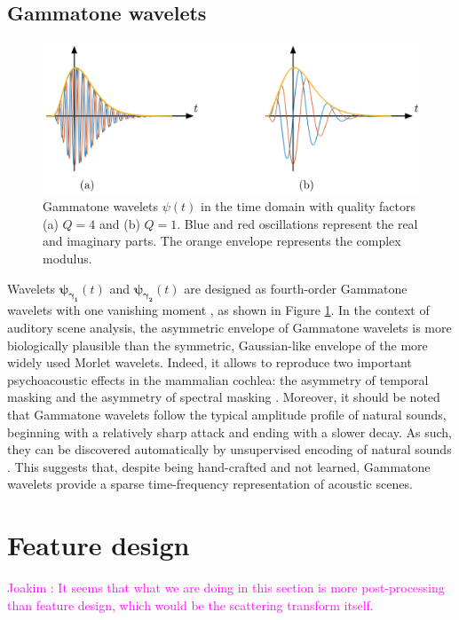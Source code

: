 \documentclass[journal]{IEEEtran}
\newcommand{\ja}[1]{\textcolor{magenta}{Joakim : #1}}
\begin{document}
\subsection{Gammatone wavelets}
\begin{figure}
\begin{center}
\includegraphics[width=\columnwidth]{gammatones.png}
\caption{
\label{fig:gammatones}
Gammatone wavelets $\psi(t)$ in the time domain with quality factors (a) $Q = 4$ and (b) $Q = 1$. Blue and red oscillations represent the real and imaginary parts. The orange envelope represents the complex modulus.}
\end{center}
\end{figure}
Wavelets
$\boldsymbol{\psi_{\gamma_1}}(t)$ and $\boldsymbol{\psi_{\gamma_2}}(t)$ are designed as fourth-order Gammatone
wavelets with one vanishing moment \cite{Venkitaraman2014}, as shown in Figure \ref{fig:gammatones}.
In the context of auditory scene analysis, the asymmetric envelope of Gammatone wavelets is more biologically plausible than the symmetric, Gaussian-like envelope of the more widely used Morlet wavelets.
Indeed, it allows to reproduce two important psychoacoustic effects in the mammalian cochlea: the asymmetry of temporal masking and the asymmetry of spectral masking  \cite{Fastl2007}.
Moreover, it should be noted that Gammatone wavelets follow the typical amplitude profile of natural sounds, beginning with a relatively sharp attack and ending with a slower decay.
As such, they can be discovered automatically by unsupervised encoding of natural sounds \cite{Smith2006}.
This suggests that, despite being hand-crafted and not learned, Gammatone wavelets provide a sparse time-frequency representation of acoustic scenes.

\section{Feature design}
\label{sec:design}
\ja{It seems that what we are doing in this section is more post-processing than feature design, which would be the scattering transform itself.}
\end{document}
